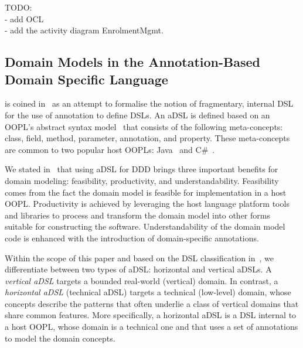 \noindent TODO:\\
- add OCL\\
- add the activity diagram EnrolmentMgmt.

\subsection{Domain Models in the Annotation-Based Domain Specific Language \dcsl}
\label{sect:bg-dcsl}

 is coined in~\cite{nosal_language_2016} as an attempt to formalise the notion of fragmentary, internal DSL~\cite{fowler_domain-specific_2010} for the use of annotation to define DSLs. An aDSL is defined based on an OOPL's abstract syntax model~\cite{le_domain_2018} that consists of the following meta-concepts: class, field, method, parameter, annotation, and property. These meta-concepts are common to two popular host OOPLs: Java~\cite{gosling_java_2014} and C\#~\cite{hejlsberg_c_2010}.

%
We stated in~\cite{le_domain_2018} that using aDSL for DDD brings three important benefits for domain modeling: feasibility, productivity, and understandability. Feasibility comes from the fact the domain model is feasible for implementation in a host OOPL. Productivity is achieved by leveraging the host language platform tools and libraries to process and transform the domain model into other forms suitable for constructing the software. Understandability of the domain model code is enhanced with the introduction of domain-specific annotations.

Within the scope of this paper and based on the DSL classification in~\cite{kleppe_software_2008}, we differentiate between two types of aDSL: horizontal and vertical aDSLs.
A \textit{vertical aDSL} targets a bounded real-world (vertical) domain. In contrast, a \textit{horizontal aDSL} (\aka technical aDSL) targets a technical (low-level) domain, whose concepts describe the patterns that often underlie a class of vertical domains that share common features. 
More specifically, a horizontal aDSL is a DSL internal to a host OOPL, whose domain is a technical one and that uses a set of annotations to model the domain concepts.


